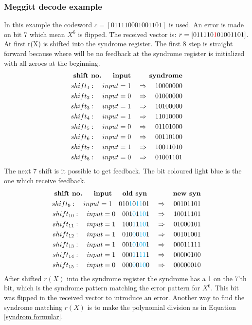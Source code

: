 \documentclass[Main]{subfiles}
\begin{document}
\subsubsection{Meggitt decode example}
\label{sec:MeggittDedocerMaterial}
In this example the codeword $ c = [0 1 1 1 1 0 0 0 1 0 0 1 1 0 1] $ is used.
An error is made on bit 7 which mean $X^6$ is flipped.
The received vector is: $ r = [0 1 1 1 1 0 {\color{red}1} 0 1 0 0 1 1 0 1] $.
At first r(X) is shifted into the syndrome register.
The first 8 step is straight forward because where will be no feedback at the syndrome register is initialized with all zeroes at the beginning.
\begin{eqnarray*}
\textbf{shift no. \quad	input \qquad syndrome}\\
shift_1: \quad input = 1 \quad \Rightarrow \quad 10000000\\
shift_2: \quad input = 0 \quad \Rightarrow \quad 01000000\\
shift_3: \quad input = 1 \quad \Rightarrow \quad 10100000\\
shift_4: \quad input = 1 \quad \Rightarrow \quad 11010000\\
shift_5: \quad input = 0 \quad \Rightarrow \quad 01101000\\
shift_6: \quad input = 0 \quad \Rightarrow \quad 00110100\\
shift_7: \quad input = 1 \quad \Rightarrow \quad 10011010\\
shift_8: \quad input = 0 \quad \Rightarrow \quad 01001101
\end{eqnarray*}
The next 7 shift is it possible to get feedback.
The bit coloured light blue is the one which receive feedback. 
\begin{eqnarray*}
\textbf{shift no. \quad	input \quad old syn \qquad \quad new syn}\\
shift_9: \quad input = 1 \quad 010{\color{cyan}1}0{\color{cyan}11}01 \quad \Rightarrow \quad 00101101\\
shift_{10}: \quad input = 0 \quad 001{\color{cyan}0}1{\color{cyan}10}1 \quad \Rightarrow \quad 10011101\\
shift_{11}: \quad input = 1 \quad 100{\color{cyan}1}1{\color{cyan}10}1 \quad \Rightarrow \quad 01000101\\
shift_{12}: \quad input = 1 \quad 010{\color{cyan}0}0{\color{cyan}10}1 \quad \Rightarrow \quad 00101001\\
shift_{13}: \quad input = 1 \quad 001{\color{cyan}0}1{\color{cyan}00}1 \quad \Rightarrow \quad 00011111\\
shift_{14}: \quad input = 1 \quad 000{\color{cyan}1}1{\color{cyan}11}1 \quad \Rightarrow \quad 00000100\\
shift_{15}: \quad input = 0 \quad 000{\color{cyan}0}0{\color{cyan}10}0 \quad \Rightarrow \quad 00000010
\end{eqnarray*}
After shifted $r(X)$ into the syndrome register the syndrome has a 1 on the 7'th bit, which is the syndrome pattern matching the error pattern for $X^6$.
This bit was flipped in the received vector to introduce an error.
Another way to find the syndrome matching $ r(X) $ is to make the polynomial division as in Equation \ref{syndrom formular}.
\end{document}
